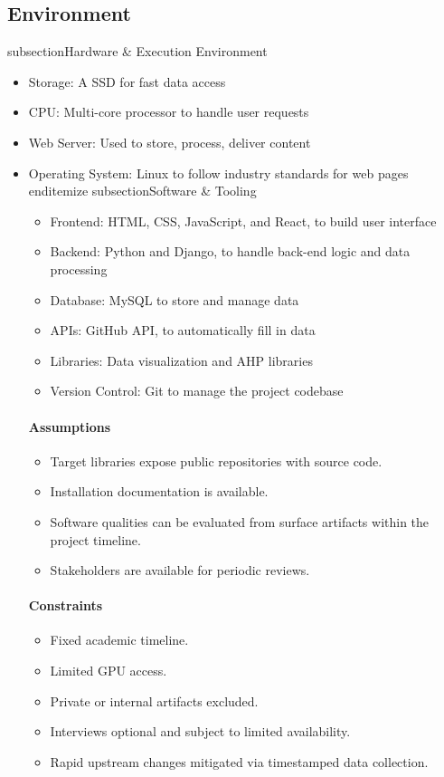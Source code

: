 \documentclass{article}
\begin{document}
\subsection{Environment}
subsection{Hardware & Execution Environment}
\begin{itemize}
    \item Storage: A SSD for fast data access
    \item CPU: Multi-core processor to handle user requests
    \item Web Server: Used to store, process, deliver content
    \item Operating System: Linux to follow industry standards for web pages
end{itemize}
subsection{Software & Tooling}
\begin{itemize}
    \item Frontend: HTML, CSS, JavaScript, and React, to build user interface
    \item Backend: Python and Django, to handle back-end logic and data processing
    \item Database: MySQL to store and manage data
    \item APIs: GitHub API, to automatically fill in data
    \item Libraries: Data visualization and AHP libraries
    \item Version Control: Git to manage the project codebase
\end{itemize}

\paragraph{Assumptions}
\begin{itemize}
  \item Target libraries expose public repositories with source code.
  \item Installation documentation is available.
  \item Software qualities can be evaluated from surface artifacts within the project timeline.
  \item Stakeholders are available for periodic reviews.
\end{itemize}

\paragraph{Constraints}
\begin{itemize}
  \item Fixed academic timeline.
  \item Limited GPU access.
  \item Private or internal artifacts excluded.
  \item Interviews optional and subject to limited availability.
  \item Rapid upstream changes mitigated via timestamped data collection.
\end{itemize}


\end{itemize}
\end{document}
